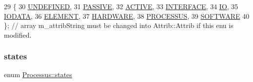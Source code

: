 \begin{DoxyCode}
29                 \{
30     \hyperlink{classAttrib_a69e171d7cc6417835a5a306d3c764235a3a8da2ab97dda18aebab196fe4100531}{UNDEFINED},
31     \hyperlink{classAttrib_a69e171d7cc6417835a5a306d3c764235a2bfb2af57b87031d190a05fe25dd92ed}{PASSIVE},
32     \hyperlink{classAttrib_a69e171d7cc6417835a5a306d3c764235a3b1fec929c0370d1436f2f06e298fb0d}{ACTIVE},
33     \hyperlink{classAttrib_a69e171d7cc6417835a5a306d3c764235aa27c16b480a369ea4d18b07b2516bbc7}{INTERFACE},
34     \hyperlink{classAttrib_a69e171d7cc6417835a5a306d3c764235a1420a5b8c0540b2af210b6975eded7f9}{IO},
35     \hyperlink{classAttrib_a69e171d7cc6417835a5a306d3c764235a0af3b0d0ac323c1704e6c69cf90add28}{IODATA},
36     \hyperlink{classAttrib_a69e171d7cc6417835a5a306d3c764235a7788bc5dd333fd8ce18562b269c9dab1}{ELEMENT},
37     \hyperlink{classAttrib_a69e171d7cc6417835a5a306d3c764235a61ceb22149f365f1780d18f9d1459423}{HARDWARE},
38     \hyperlink{classAttrib_a69e171d7cc6417835a5a306d3c764235a75250e29692496e73effca2c0330977f}{PROCESSUS},
39     \hyperlink{classAttrib_a69e171d7cc6417835a5a306d3c764235a103a67cd0b8f07ef478fa45d4356e27b}{SOFTWARE} 
40   \}; \textcolor{comment}{// array m\_attribString must be changed into Attrib::Attrib if this enu is modified. }
\end{DoxyCode}
\mbox{\label{classProcessus_a36278773bd98f2d5612fea40c7774821}} 
\subsubsection{\texorpdfstring{states}{states}}
{\footnotesize\ttfamily enum \hyperlink{classProcessus_a36278773bd98f2d5612fea40c7774821}{Processus\+::states}\hspace{0.3cm}{\ttfamily [inherited]}}

